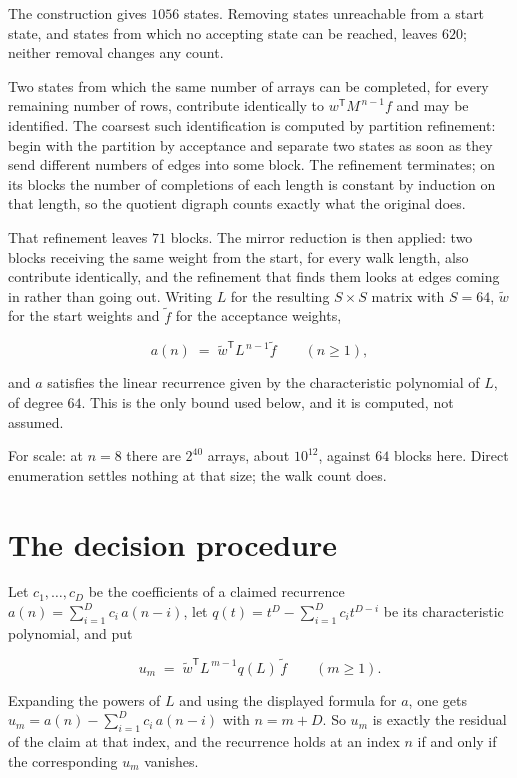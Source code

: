 \documentclass[11pt]{article}
\theoremstyle{definition}
\begin{document}
The construction gives $1056$ states. Removing states unreachable from a start state, and states from which no accepting state can be reached, leaves $620$; neither removal changes any count.

Two states from which the same number of arrays can be completed, for every remaining number of rows, contribute identically to $w^{\mathsf T}M^{\,n-1}f$ and may be identified. The coarsest such identification is computed by partition refinement: begin with the partition by acceptance and separate two states as soon as they send different numbers of edges into some block. The refinement terminates; on its blocks the number of completions of each length is constant by induction on that length, so the quotient digraph counts exactly what the original does.

That refinement leaves $71$ blocks. The mirror reduction is then applied: two blocks receiving the same weight from the start, for every walk length, also contribute identically, and the refinement that finds them looks at edges coming in rather than going out. Writing $L$ for the resulting $S \times S$ matrix with $S = 64$, $\tilde w$ for the start weights and $\tilde f$ for the acceptance weights,

\[a(n) \;=\; \tilde w^{\mathsf T} L^{\,n-1} \tilde f \qquad (n \ge 1),\]

and $a$ satisfies the linear recurrence given by the characteristic polynomial of $L$, of degree $64$. This is the only bound used below, and it is computed, not assumed.

For scale: at $n = 8$ there are $2^{40}$ arrays, about $10^{12}$, against $64$ blocks here. Direct enumeration settles nothing at that size; the walk count does.

\section{The decision procedure}

Let $c_1,\dots,c_D$ be the coefficients of a claimed recurrence $a(n) = \sum_{i=1}^{D} c_i\,a(n-i)$, let $q(t) = t^{D} - \sum_{i=1}^{D} c_i t^{D-i}$ be its characteristic polynomial, and put

\[u_m \;=\; \tilde w^{\mathsf T} L^{\,m-1} q(L)\,\tilde f \qquad (m \ge 1).\]

Expanding the powers of $L$ and using the displayed formula for $a$, one gets $u_m = a(n) - \sum_{i=1}^{D} c_i\,a(n-i)$ with $n = m + D$. So $u_m$ is exactly the residual of the claim at that index, and the recurrence holds at an index $n$ if and only if the corresponding $u_m$ vanishes.
\end{document}
